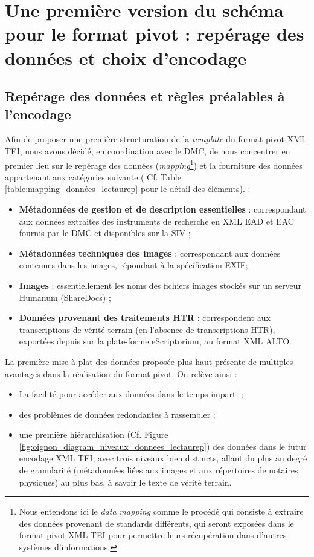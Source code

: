 \section{Une première version du schéma pour le format pivot : repérage des données et choix d'encodage}

\subsection{Repérage des données et règles préalables à l'encodage}

Afin de proposer une première structuration de la \textit{template} du format pivot XML TEI, nous avons décidé, en coordination avec le DMC, de nous concentrer en premier lieu sur le repérage des données (\textit{mapping}\footnote{Nous entendons ici le \textit{data mapping} comme le procédé qui consiste à extraire des données provenant de standards différents, qui seront exposées dans le format pivot XML TEI pour permettre leurs récupération dans d'autres systèmes d'informations.}) et la fourniture des données appartenant aux catégories suivante ( Cf. Table \ref{table:mapping_données_lectaurep} pour le détail des éléments). :  

\begin{itemize}
    \item \textbf{Métadonnées de gestion et de description essentielles} : correspondant aux données extraites des instruments de recherche en XML EAD et EAC fournis par le DMC et disponibles sur la SIV ;
    \item \textbf{Métadonnées techniques des images} : correspondant aux données contenues dans les images, répondant à la spécification EXIF;
    \item \textbf{Images} : essentiellement les noms des fichiers images stockés sur un serveur Humanum (ShareDocs) ;
    \item \textbf{Données provenant des traitements HTR} : correspondent aux transcriptions de vérité terrain (en l'absence de transcriptions HTR), exportées depuis sur la plate-forme eScriptorium, au format XML ALTO.
\end{itemize}


La première mise à plat des données proposée plus haut présente de multiples avantages dans la réalisation du format pivot. On relève ainsi : 
\begin{itemize}
    \item La facilité pour accéder aux données dans le temps imparti ;
    \item des problèmes de données redondantes à rassembler ;
    \item une première hiérarchisation (Cf. Figure \ref{fig:oignon_diagram_niveaux_donnees_lectaurep}) des données dans le futur encodage XML TEI, avec trois niveaux bien distincts, allant du plus au degré de granularité (métadonnées liées aux images et aux répertoires de notaires physiques) au plus bas, à savoir le texte de vérité terrain.
\end{itemize}

